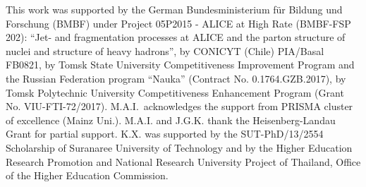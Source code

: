 \documentclass[aps,prd,floatfix,superscriptaddress,showpacs,showkeys]{revtex4}
\begin{document}
\begin{acknowledgments}

This work was supported
by the German Bundesministerium f\"ur Bildung und Forschung (BMBF)
under Project 05P2015 - ALICE at High Rate (BMBF-FSP 202):
``Jet- and fragmentation processes at ALICE and the parton structure 
of nuclei and structure of heavy hadrons'', 
by CONICYT (Chile) PIA/Basal FB0821, 
by Tomsk State University Competitiveness 
Improvement Program and the Russian Federation program ``Nauka'' 
(Contract No. 0.1764.GZB.2017), 
by Tomsk Polytechnic University Competitiveness Enhancement Program 
(Grant No. VIU-FTI-72/2017). 
M.A.I.\ acknowledges the support from  PRISMA cluster of excellence 
(Mainz Uni.). M.A.I. and J.G.K. thank the Heisenberg-Landau Grant for
partial support.  
K.X. was supported by the SUT-PhD/13/2554 Scholarship of
Suranaree University of Technology and by the Higher Education Research
Promotion and National Research University Project of Thailand, Office of
the Higher Education Commission.

\end{acknowledgments}
\end{document}
